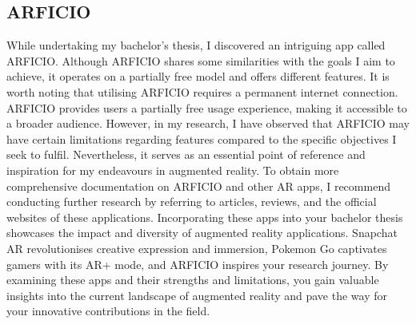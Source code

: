 \subsection{ARFICIO}
While undertaking my bachelor's thesis, I discovered an intriguing app called ARFICIO. Although ARFICIO shares some similarities with the goals I aim to achieve, it operates on a partially free model and offers different features. It is worth noting that utilising ARFICIO requires a permanent internet connection.
ARFICIO provides users a partially free usage experience, making it accessible to a broader audience. However, in my research, I have observed that ARFICIO may have certain limitations regarding features compared to the specific objectives I seek to fulfil. Nevertheless, it serves as an essential point of reference and inspiration for my endeavours in augmented reality.
To obtain more comprehensive documentation on ARFICIO and other AR apps, I recommend conducting further research by referring to articles, reviews, and the official websites of these applications.
Incorporating these apps into your bachelor thesis showcases the impact and diversity of augmented reality applications. Snapchat AR revolutionises creative expression and immersion, Pokemon Go captivates gamers with its AR+ mode, and ARFICIO inspires your research journey. By examining these apps and their strengths and limitations, you gain valuable insights into the current landscape of augmented reality and pave the way for your innovative contributions in the field.